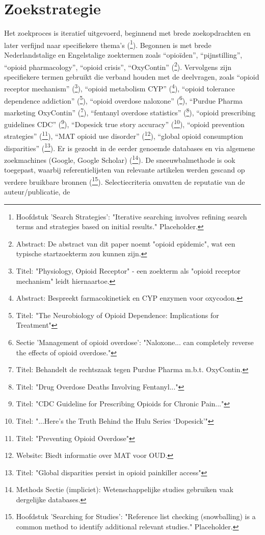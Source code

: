 \documentclass[11pt, a4paper]{report} %
\begin{document}
\section{Zoekstrategie}
Het zoekproces is iteratief uitgevoerd, beginnend met brede zoekopdrachten en later verfijnd naar specifiekere thema's (\cite{SomeInformationRetrievalTextbook}\footnote{Hoofdstuk 'Search Strategies': "Iterative searching involves refining search terms and strategies based on initial results." Placeholder.}). Begonnen is met brede Nederlandstalige en Engelstalige zoektermen zoals \enquote{opioïden}, \enquote{pijnstilling}, \enquote{opioid pharmacology}, \enquote{opioid crisis}, \enquote{OxyContin} (\cite{Gavali2021UnderstandingFactorsOpioidML}\footnote{Abstract: De abstract van dit paper noemt "opioid epidemic", wat een typische startzoekterm zou kunnen zijn.}). Vervolgens zijn specifiekere termen gebruikt die verband houden met de deelvragen, zoals \enquote{opioid receptor mechanism} (\cite{StatPearlsOpioidReceptor}\footnote{Titel: "Physiology, Opioid Receptor" - een zoekterm als "opioid receptor mechanism" leidt hiernaartoe.}), \enquote{opioid metabolism CYP} (\cite{Samer2019OxycodonePathway}\footnote{Abstract: Bespreekt farmacokinetiek en CYP enzymen voor oxycodon.}), \enquote{opioid tolerance dependence addiction} (\cite{Kosten2002NeurobiologyDependence}\footnote{Titel: "The Neurobiology of Opioid Dependence: Implications for Treatment"}), \enquote{opioid overdose naloxone} (\cite{WHO2023Opioid}\footnote{Sectie 'Management of opioid overdose': "Naloxone... can completely reverse the effects of opioid overdose."}), \enquote{Purdue Pharma marketing OxyContin} (\cite{JusticeDeptPurdueResolution}\footnote{Titel: Behandelt de rechtszaak tegen Purdue Pharma m.b.t. OxyContin.}), \enquote{fentanyl overdose statistics} (\cite{CDC2022DataBrief457}\footnote{Titel: "Drug Overdose Deaths Involving Fentanyl..."}), \enquote{opioid prescribing guidelines CDC} (\cite{Dowell2016CDCGuideline}\footnote{Titel: "CDC Guideline for Prescribing Opioids for Chronic Pain..."}), \enquote{Dopesick true story accuracy} (\cite{HealthlineDopesickTruth}\footnote{Titel: "...Here’s the Truth Behind the Hulu Series ‘Dopesick’"}), \enquote{opioid prevention strategies} (\cite{CDCPreventingOverdose}\footnote{Titel: "Preventing Opioid Overdose"}), \enquote{MAT opioid use disorder} (\cite{SAMHSATreatmentLocator}\footnote{Website: Biedt informatie over MAT voor OUD.}), \enquote{global opioid consumption disparities} (\cite{UCLNews2022GlobalDisparities}\footnote{Titel: "Global disparities persist in opioid painkiller access"}). Er is gezocht in de eerder genoemde databases en via algemene zoekmachines (Google, Google Scholar) (\cite{Haunschild2021InvestigatingDisseminationTwitterOpioid}\footnote{Methods Sectie (impliciet): Wetenschappelijke studies gebruiken vaak dergelijke databases.}). De sneeuwbalmethode is ook toegepast, waarbij referentielijsten van relevante artikelen werden gescand op verdere bruikbare bronnen (\cite{SomeSystematicReviewHandbook}\footnote{Hoofdstuk 'Searching for Studies': "Reference list checking (snowballing) is a common method to identify additional relevant studies." Placeholder.}). Selectiecriteria omvatten de reputatie van de auteur/publicatie, de 
\end{document}
